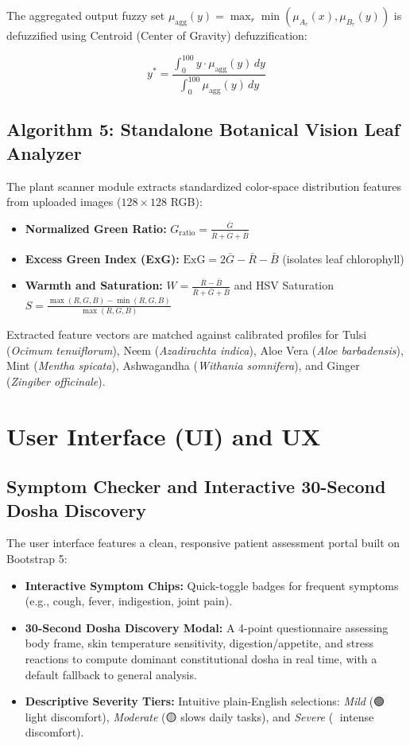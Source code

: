 \documentclass[12pt,a4paper]{article}
\begin{document}
The aggregated output fuzzy set $\mu_{\text{agg}}(y) = \max_r \min(\mu_{A_r}(x), \mu_{B_r}(y))$ is defuzzified using Centroid (Center of Gravity) defuzzification:

\begin{equation}
y^* = \frac{\int_{0}^{100} y \cdot \mu_{\text{agg}}(y) \, dy}{\int_{0}^{100} \mu_{\text{agg}}(y) \, dy}
\end{equation}

\subsection{Algorithm 5: Standalone Botanical Vision Leaf Analyzer}
The plant scanner module extracts standardized color-space distribution features from uploaded images ($128 \times 128$ RGB):
\begin{itemize}
    \item \textbf{Normalized Green Ratio:} $G_{\text{ratio}} = \frac{\bar{G}}{\bar{R} + \bar{G} + \bar{B}}$
    \item \textbf{Excess Green Index (ExG):} $\text{ExG} = 2\bar{G} - \bar{R} - \bar{B}$ (isolates leaf chlorophyll)
    \item \textbf{Warmth and Saturation:} $W = \frac{\bar{R} - \bar{B}}{\bar{R} + \bar{G} + \bar{B}}$ and HSV Saturation $S = \frac{\max(R,G,B) - \min(R,G,B)}{\max(R,G,B)}$
\end{itemize}
Extracted feature vectors are matched against calibrated profiles for Tulsi (\textit{Ocimum tenuiflorum}), Neem (\textit{Azadirachta indica}), Aloe Vera (\textit{Aloe barbadensis}), Mint (\textit{Mentha spicata}), Ashwagandha (\textit{Withania somnifera}), and Ginger (\textit{Zingiber officinale}).

\newpage
\section{User Interface (UI) and UX}

\subsection{Symptom Checker and Interactive 30-Second Dosha Discovery}
The user interface features a clean, responsive patient assessment portal built on Bootstrap 5:
\begin{itemize}
    \item \textbf{Interactive Symptom Chips:} Quick-toggle badges for frequent symptoms (e.g., cough, fever, indigestion, joint pain).
    \item \textbf{30-Second Dosha Discovery Modal:} A 4-point questionnaire assessing body frame, skin temperature sensitivity, digestion/appetite, and stress reactions to compute dominant constitutional dosha in real time, with a default fallback to general analysis.
    \item \textbf{Descriptive Severity Tiers:} Intuitive plain-English selections: \textit{Mild} (🟢 light discomfort), \textit{Moderate} (🟡 slows daily tasks), and \textit{Severe} (🔴 intense discomfort).
\end{itemize}
\end{document}
